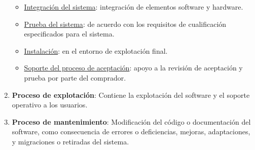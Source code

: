 \begin{enumerate}
\begin{itemize}
        \item \uline{Integración del sistema}: integración de elementos software y hardware.
        \item \uline{Prueba del sistema}: de acuerdo con los requisitos de cualificación especificados para el sistema.
        \item \uline{Instalación}: en el entorno de explotación final.
        \item \uline{Soporte del proceso de aceptación}: apoyo a la revisión de aceptación y prueba por parte del comprador.
    \end{itemize}
    \item \textbf{Proceso de explotación}: Contiene la explotación del software y el soporte operativo a los usuarios.
    \item \textbf{Proceso de mantenimiento}: Modificación del código o documentación del software, como consecuencia de errores o deficiencias, mejoras, adaptaciones, y migraciones o retiradas del sistema.
\end{enumerate}

